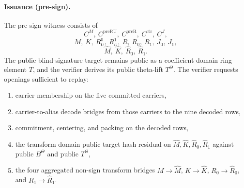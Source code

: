 \paragraph{Issuance (pre-sign).}
The pre-sign witness consists of
\[
  C^M,\ C^{\mathrm{preRU}},\ C^{\mathrm{preR}},\ C^{\mathrm{ctr}},\ C^J,
\]
\[
  M,\ K,\ R_U^0,\ R_U^1,\ R,\ R_0,\ R_1,\ J_0,\ J_1,
\]
\[
  \widehat M,\ \widehat K,\ \widehat R_0,\ \widehat R_1.
\]
The public blind-signature target remains public as a coefficient-domain ring
element \(T\), and the verifier derives its public theta-lift \(T^\Theta\). The
verifier requests openings sufficient to replay:
\begin{enumerate}[leftmargin=1.25em]
  \item carrier membership on the five committed carriers,
  \item carrier-to-alias decode bridges from those carriers to the nine
  decoded rows,
  \item commitment, centering, and packing on the decoded rows,
  \item the transform-domain public-target hash residual on
  \(\widehat M,\widehat K,\widehat R_0,\widehat R_1\) against public
  \(B^\Theta\) and public \(T^\Theta\),
  \item the four aggregated non-sign transform bridges
  \(M\!\to\!\widehat M\), \(K\!\to\!\widehat K\),
  \(R_0\!\to\!\widehat R_0\), and \(R_1\!\to\!\widehat R_1\).
\end{enumerate}

